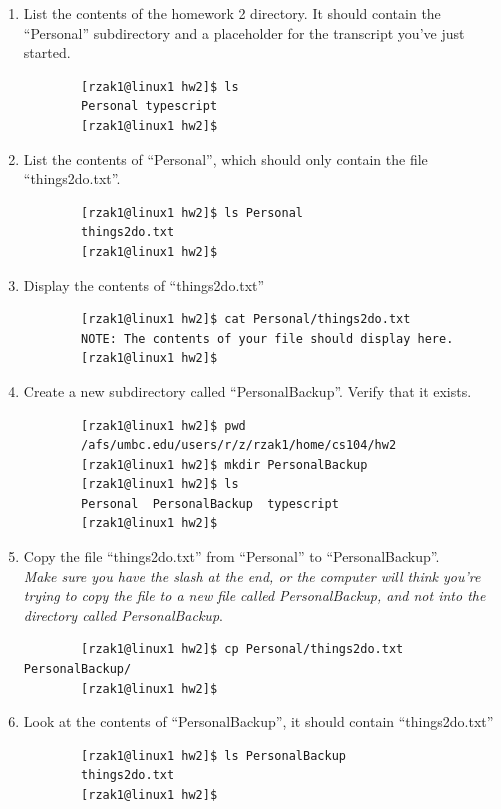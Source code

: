 \documentclass[letter,11pt]{article}
\begin{document}
\begin{enumerate}
\begin{verbatim}
        Script started, file is typescript
        [rzak1@linux1 hw2]$\end{verbatim}
    \item List the contents of the homework 2 directory. It should contain the ``Personal'' subdirectory and a placeholder for the transcript you've just started.
    \begin{verbatim}
        [rzak1@linux1 hw2]$ ls
        Personal typescript
        [rzak1@linux1 hw2]$\end{verbatim}
    \item List the contents of ``Personal'', which should only contain the file ``things2do.txt''.
    \begin{verbatim}
        [rzak1@linux1 hw2]$ ls Personal
        things2do.txt
        [rzak1@linux1 hw2]$\end{verbatim}
    \item Display the contents of ``things2do.txt''
    \begin{verbatim}
        [rzak1@linux1 hw2]$ cat Personal/things2do.txt
        NOTE: The contents of your file should display here.
        [rzak1@linux1 hw2]$\end{verbatim}
    \item Create a new subdirectory called ``PersonalBackup''. Verify that it exists.
    \begin{verbatim}
        [rzak1@linux1 hw2]$ pwd
        /afs/umbc.edu/users/r/z/rzak1/home/cs104/hw2
        [rzak1@linux1 hw2]$ mkdir PersonalBackup
        [rzak1@linux1 hw2]$ ls
        Personal  PersonalBackup  typescript
        [rzak1@linux1 hw2]$\end{verbatim}
    \item Copy the file ``things2do.txt'' from ``Personal'' to ``PersonalBackup''. \\
    \textit{Make sure you have the slash at the end, or the computer will think you're trying to copy the file to a new file called PersonalBackup, and not into the directory called PersonalBackup}.
    \begin{verbatim}
        [rzak1@linux1 hw2]$ cp Personal/things2do.txt PersonalBackup/
        [rzak1@linux1 hw2]$\end{verbatim}
    \item Look at the contents of ``PersonalBackup'', it should contain ``things2do.txt''
    \begin{verbatim}
        [rzak1@linux1 hw2]$ ls PersonalBackup
        things2do.txt
        [rzak1@linux1 hw2]$\end{verbatim}

\end{enumerate}
\end{document}
